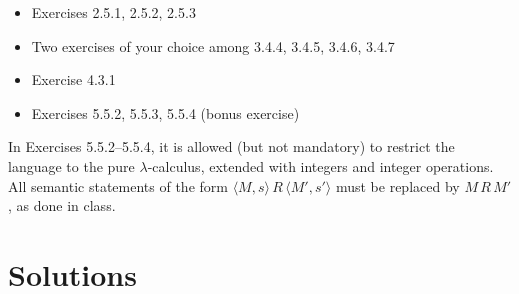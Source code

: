 \documentclass[11pt,a4paper]{article}
\theoremstyle{definition}
\begin{document}
\begin{itemize}
  \item Exercises 2.5.1, 2.5.2, 2.5.3
  \item Two exercises of your choice among 3.4.4, 3.4.5, 3.4.6, 3.4.7
  \item Exercise 4.3.1
  \item Exercises 5.5.2, 5.5.3, 5.5.4 (bonus exercise)
\end{itemize}

In Exercises 5.5.2–5.5.4, it is allowed (but not mandatory) to restrict the
language to the pure $\lambda$-calculus, extended with integers and integer
operations. All semantic statements of the form
$\langle M, s \rangle \, R \, \langle M', s' \rangle$ must be replaced by
$M \, R \, M'$, as done in class.

\newpage
\section*{Solutions}


\newpage

\newpage

\newpage

\newpage

\newpage

\newpage

\newpage

\newpage

\end{document}

